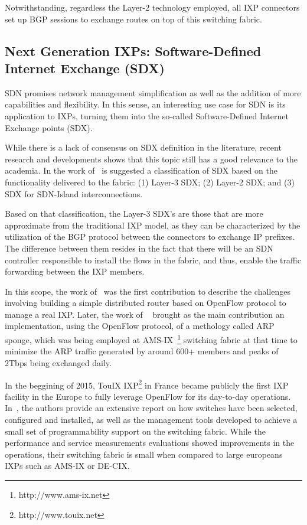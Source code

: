 \documentclass[conference]{IEEEtran/IEEEtran}
\begin{document}
Notwithstanding, regardless the Layer-2 technology employed, all IXP connectors set up BGP sessions to exchange routes on top of this switching fabric.

\subsection{Next Generation IXPs: Software-Defined Internet Exchange (SDX)}
SDN promises network management simplification as well as the addition of more capabilities and flexibility. In this sense, an interesting use case for SDN is its application to IXPs, turning them into the so-called Software-Defined Internet Exchange points (SDX). 

While there is a lack of consensus on SDX definition in the literature, recent research and developments shows that this topic still has a good relevance to the academia. In the work of~\cite{chungatlanticwave} is suggested a classification of SDX based on the functionality delivered to the fabric: (1) Layer-3 SDX; (2) Layer-2 SDX; and (3) SDX for SDN-Island interconnections.

Based on that classification, the Layer-3 SDX's are those that are more approximate from the traditional IXP model, as they can be characterized by the utilization of the BGP protocol between the connectors to exchange IP prefixes. The difference between them resides in the fact that there will be an SDN controller responsible to install the flows in the fabric, and thus, enable the traffic forwarding between the IXP members. 

In this scope, the work of~\cite{stringer2013cardigan} was the first contribution to describe the challenges involving building a simple distributed router based on OpenFlow protocol to manage a real IXP. Later, the work of ~\cite{ams2013victor} brought as the main contribution an implementation, using the OpenFlow protocol, of a methology called ARP sponge, which was being employed at AMS-IX~\footnote{http://www.ams-ix.net} switching fabric at that time to minimize the ARP traffic generated by around 600+ members and peaks of 2Tbps being exchanged daily. 

In the beggining of 2015, TouIX IXP\footnote{http://www.touix.net} in France became publicly the first IXP facility in the Europe to fully leverage OpenFlow for its day-to-day operations. In~\cite{lapeyrade2016openflow}, the authors provide an extensive report on how switches have been selected, configured and installed, as well as the management tools developed to achieve a small set of programmability support on the switching fabric. While the performance and service measurements evaluations showed improvements in the operations, their switching fabric is small when compared to large europeans IXPs such as AMS-IX or DE-CIX. 
\end{document}
